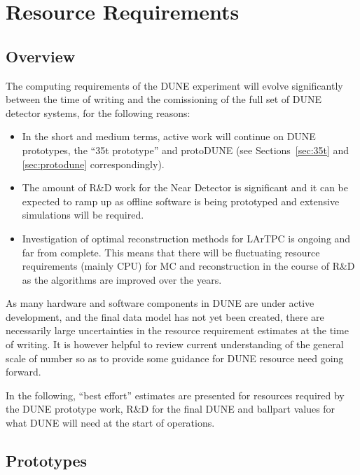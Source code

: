 \section{Resource Requirements}
\label{sec:resource-requirements}
\subsection{Overview}
The computing requirements of the DUNE experiment will evolve significantly between the time of writing
and the comissioning of the full set of DUNE detector systems, for the following reasons:
\begin{itemize}
\item In the short and medium terms, active work will continue on DUNE prototypes, the ``35t prototype'' and protoDUNE
(see Sections~\ref{sec:35t} and \ref{sec:protodune} correspondingly).

\item The amount of R\&D work for the Near Detector is significant and it can be expected to ramp up as offline software
is being prototyped and extensive simulations will be required.

\item Investigation of optimal reconstruction methods for LArTPC is ongoing and far from complete. This means
that there will be fluctuating resource requirements (mainly CPU) for MC and reconstruction in the course of R\&D
as the algorithms are improved over the years.

\end{itemize}

\noindent
As many hardware and software components in DUNE are under active development,
and the final data model has not yet been created, there are necessarily large uncertainties in the resource requirement estimates
at the time of writing. It is however helpful to review current understanding of the general scale of number so as to provide some
guidance for DUNE resource need going forward.

In the following, ``best effort'' estimates are presented for resources required by the DUNE prototype work,  R\&D for the final DUNE
and ballpart values for what DUNE will need at the start of operations.

\subsection{Prototypes}
